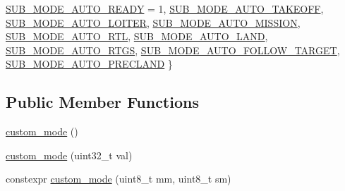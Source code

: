 \begin{DoxyCompactItemize}
\mbox{\hyperlink{unionpx4_1_1custom__mode_af4b9497eeaa602d1677ab9f2c2b16931aeda06ad44364052e6f1b6f563f91617a}{S\+U\+B\+\_\+\+M\+O\+D\+E\+\_\+\+A\+U\+T\+O\+\_\+\+R\+E\+A\+DY}} = 1, 
\mbox{\hyperlink{unionpx4_1_1custom__mode_af4b9497eeaa602d1677ab9f2c2b16931a46576d97e4d204328549e9d06ac5c0fd}{S\+U\+B\+\_\+\+M\+O\+D\+E\+\_\+\+A\+U\+T\+O\+\_\+\+T\+A\+K\+E\+O\+FF}}, 
\mbox{\hyperlink{unionpx4_1_1custom__mode_af4b9497eeaa602d1677ab9f2c2b16931a94fe281989d83738e25786cfe5485362}{S\+U\+B\+\_\+\+M\+O\+D\+E\+\_\+\+A\+U\+T\+O\+\_\+\+L\+O\+I\+T\+ER}}, 
\mbox{\hyperlink{unionpx4_1_1custom__mode_af4b9497eeaa602d1677ab9f2c2b16931aed57873578d51a465c8d63e7990a87be}{S\+U\+B\+\_\+\+M\+O\+D\+E\+\_\+\+A\+U\+T\+O\+\_\+\+M\+I\+S\+S\+I\+ON}}, 
\newline
\mbox{\hyperlink{unionpx4_1_1custom__mode_af4b9497eeaa602d1677ab9f2c2b16931aadb59f97c23a3788d66d4b0124d816d3}{S\+U\+B\+\_\+\+M\+O\+D\+E\+\_\+\+A\+U\+T\+O\+\_\+\+R\+TL}}, 
\mbox{\hyperlink{unionpx4_1_1custom__mode_af4b9497eeaa602d1677ab9f2c2b16931a100b444190916dbafde33b3c01e3587f}{S\+U\+B\+\_\+\+M\+O\+D\+E\+\_\+\+A\+U\+T\+O\+\_\+\+L\+A\+ND}}, 
\mbox{\hyperlink{unionpx4_1_1custom__mode_af4b9497eeaa602d1677ab9f2c2b16931a79c6c21c7be403f2018ef34a424bf0b5}{S\+U\+B\+\_\+\+M\+O\+D\+E\+\_\+\+A\+U\+T\+O\+\_\+\+R\+T\+GS}}, 
\mbox{\hyperlink{unionpx4_1_1custom__mode_af4b9497eeaa602d1677ab9f2c2b16931a2905d380ca96cd743e6b9cb18e1096ab}{S\+U\+B\+\_\+\+M\+O\+D\+E\+\_\+\+A\+U\+T\+O\+\_\+\+F\+O\+L\+L\+O\+W\+\_\+\+T\+A\+R\+G\+ET}}, 
\newline
\mbox{\hyperlink{unionpx4_1_1custom__mode_af4b9497eeaa602d1677ab9f2c2b16931ae10faec122c6ba69ea6621608e33d114}{S\+U\+B\+\_\+\+M\+O\+D\+E\+\_\+\+A\+U\+T\+O\+\_\+\+P\+R\+E\+C\+L\+A\+ND}}
 \}
\end{DoxyCompactItemize}
\subsection*{Public Member Functions}
\begin{DoxyCompactItemize}
\item 
\mbox{\hyperlink{unionpx4_1_1custom__mode_ab0c7242aebd522ecb3b5c29dc2bac22e}{custom\+\_\+mode}} ()
\item 
\mbox{\hyperlink{unionpx4_1_1custom__mode_aa6c0760c6eee89d5eb614d37df582259}{custom\+\_\+mode}} (uint32\+\_\+t val)
\item 
constexpr \mbox{\hyperlink{unionpx4_1_1custom__mode_ae7df6c23989aea73a1b6857c778dc602}{custom\+\_\+mode}} (uint8\+\_\+t mm, uint8\+\_\+t sm)
\end{DoxyCompactItemize}
